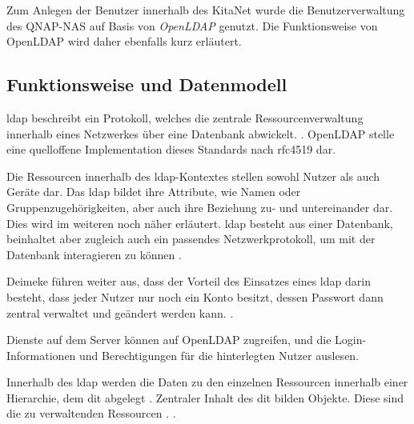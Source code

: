Zum Anlegen der Benutzer innerhalb des KitaNet wurde die Benutzerverwaltung des QNAP-NAS auf Basis von \textit{OpenLDAP} genutzt. Die Funktionsweise von OpenLDAP wird daher ebenfalls kurz erläutert.

\subsection{Funktionsweise und Datenmodell}

\ac{ldap} beschreibt  ein Protokoll, welches die zentrale Ressourcenverwaltung innerhalb eines Netzwerkes über eine Datenbank abwickelt.
 \citep[][611]{Deimeke2019}. OpenLDAP stelle eine quelloffene Implementation dieses Standards nach \ac{rfc}4519 dar.

Die Ressourcen innerhalb des \ac{ldap}-Kontextes stellen sowohl Nutzer als auch Geräte dar. Das \ac{ldap} bildet ihre Attribute, wie Namen oder Gruppenzugehörigkeiten, aber auch ihre Beziehung zu- und untereinander dar. Dies wird im weiteren noch näher erläutert. 
\ac{ldap} besteht aus einer Datenbank, beinhaltet aber zugleich auch ein passendes Netzwerkprotokoll, um mit der Datenbank interagieren zu können \citep[vgl.][3]{Gietz}.

Deimeke \ua führen weiter aus, dass der Vorteil des Einsatzes eines \ac{ldap} darin besteht, dass jeder Nutzer nur noch ein Konto besitzt, dessen Passwort dann zentral verwaltet und geändert werden kann.  \citep[][611]{Deimeke2019}.

Dienste auf dem Server können auf OpenLDAP zugreifen, und die Login-Informationen und Berechtigungen für die hinterlegten Nutzer auslesen.

Innerhalb des \ac{ldap} werden die Daten zu den einzelnen Ressourcen innerhalb einer Hierarchie, dem \ac{dit} abgelegt \citep[vgl.][7]{rfc4512}. Zentraler Inhalt des \ac{dit} bilden Objekte. Diese sind die zu verwaltenden Ressourcen \citep[vgl.][614]{Deimeke2019}. 
 \citep[][614]{Deimeke2019}. 

